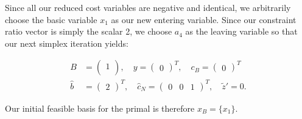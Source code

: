 \begin{solution}
    Since all our reduced cost variables are negative and identical, we arbitrarily choose the basic variable $x_1$ as
    our new entering variable. Since our constraint ratio vector is simply the scalar 2, we choose $a_4$ as the leaving 
    variable so that our next simplex iteration yields:

    \begin{align*}
      B &= \begin{pmatrix}
        1  \\
      \end{pmatrix}, \quad y = \begin{pmatrix}
        0 
      \end{pmatrix}^T, \quad c_B = \begin{pmatrix}
        0
      \end{pmatrix}^T \\
      \hat{b} &= \begin{pmatrix}
        2
      \end{pmatrix}^T, \quad \hat{c}_N = \begin{pmatrix}
        0 & 0 & 1
      \end{pmatrix}^T, \quad \tilde{z}' = 0.
    \end{align*}

    Our initial feasible basis for the primal is therefore $x_B = \{ x_1 \}$.

\end{solution}